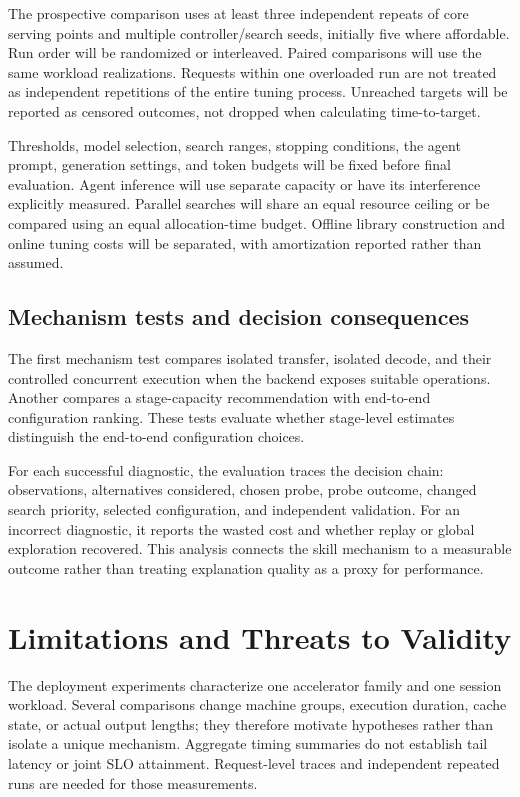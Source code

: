 \documentclass[preprint,12pt]{elsarticle}
\begin{document}
The prospective comparison uses at least three independent repeats of core serving points and multiple controller/search seeds, initially five where affordable. Run order will be randomized or interleaved. Paired comparisons will use the same workload realizations. Requests within one overloaded run are not treated as independent repetitions of the entire tuning process. Unreached targets will be reported as censored outcomes, not dropped when calculating time-to-target.

Thresholds, model selection, search ranges, stopping conditions, the agent prompt, generation settings, and token budgets will be fixed before final evaluation. Agent inference will use separate capacity or have its interference explicitly measured. Parallel searches will share an equal resource ceiling or be compared using an equal allocation-time budget. Offline library construction and online tuning costs will be separated, with amortization reported rather than assumed.

\subsection{Mechanism tests and decision consequences}
The first mechanism test compares isolated transfer, isolated decode, and their controlled concurrent execution when the backend exposes suitable operations. Another compares a stage-capacity recommendation with end-to-end configuration ranking. These tests evaluate whether stage-level estimates distinguish the end-to-end configuration choices.

For each successful diagnostic, the evaluation traces the decision chain: observations, alternatives considered, chosen probe, probe outcome, changed search priority, selected configuration, and independent validation. For an incorrect diagnostic, it reports the wasted cost and whether replay or global exploration recovered. This analysis connects the skill mechanism to a measurable outcome rather than treating explanation quality as a proxy for performance.



\section{Limitations and Threats to Validity}
The deployment experiments characterize one accelerator family and one session workload. Several comparisons change machine groups, execution duration, cache state, or actual output lengths; they therefore motivate hypotheses rather than isolate a unique mechanism. Aggregate timing summaries do not establish tail latency or joint SLO attainment. Request-level traces and independent repeated runs are needed for those measurements.
\end{document}
